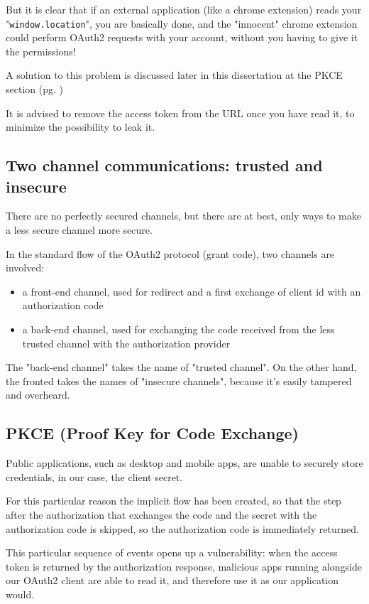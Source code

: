 But it is clear that if an external application (like a chrome extension) reads
your "\texttt{window.location}", you are basically done, and the "innocent" chrome
extension could perform OAuth2 requests with your account, without you having to
give it the permissions!

A solution to this problem is discussed later in this dissertation at the PKCE
section (pg. \pageref{pkce})

It is advised to remove the access token from the URL once you have read it, to
minimize the possibility to leak it.

\subsection{Two channel communications: trusted and insecure}
There are no perfectly secured channels, but there are at
best, only ways to make a less secure channel more secure.

In the standard flow of the OAuth2 protocol (grant code), two channels are
involved:
\begin{itemize}
    \item a front-end channel, used for redirect and a first exchange of client
        id with an authorization code
    \item a back-end channel, used for exchanging the code received from the
        less trusted channel with the authorization provider
\end{itemize}

The "back-end channel" takes the name of "trusted channel". On the other hand,
the fronted takes the names of "insecure channels", because it's easily tampered
and overheard.

\subsection{PKCE (Proof Key for Code Exchange)}
\label{pkce}
Public applications, such as desktop and mobile apps, are unable to securely
store credentials, in our case, the client secret.

For this particular reason the implicit flow has been created, so
that the step after the authorization that exchanges the code and the secret
with the authorization code is skipped, so the authorization code is immediately
returned.

This particular sequence of events opens up a vulnerability:
when the access token is returned by the authorization response, malicious apps
running alongside our OAuth2 client are able to read it, and therefore use it as
our application would.

